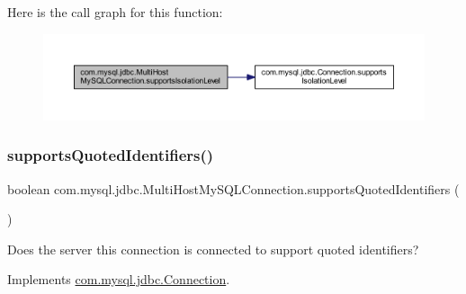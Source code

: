 Here is the call graph for this function\+:
\nopagebreak
\begin{figure}[H]
\begin{center}
\leavevmode
\includegraphics[width=350pt]{classcom_1_1mysql_1_1jdbc_1_1_multi_host_my_s_q_l_connection_a0c4936bc033352ae568d8ae567f6d495_cgraph}
\end{center}
\end{figure}
\mbox{\label{classcom_1_1mysql_1_1jdbc_1_1_multi_host_my_s_q_l_connection_af49bebe337318800930bddf6351d53f2}} 
\subsubsection{\texorpdfstring{supports\+Quoted\+Identifiers()}{supportsQuotedIdentifiers()}}
{\footnotesize\ttfamily boolean com.\+mysql.\+jdbc.\+Multi\+Host\+My\+S\+Q\+L\+Connection.\+supports\+Quoted\+Identifiers (\begin{DoxyParamCaption}{ }\end{DoxyParamCaption})}

Does the server this connection is connected to support quoted identifiers? 

Implements \mbox{\hyperlink{interfacecom_1_1mysql_1_1jdbc_1_1_connection_a16e68907781a09083ff1afda25dff502}{com.\+mysql.\+jdbc.\+Connection}}.

